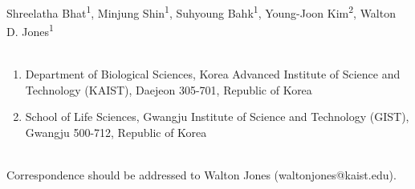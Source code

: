 Shreelatha Bhat\textsuperscript{1}, Minjung Shin\textsuperscript{1}, Suhyoung Bahk\textsuperscript{1}, Young-Joon Kim\textsuperscript{2}, Walton D. Jones\textsuperscript{1}
\\
\\
\begin{enumerate}
\item Department of Biological Sciences, Korea Advanced Institute of Science and Technology (KAIST), Daejeon 305-701, Republic of Korea
\item School of Life Sciences, Gwangju Institute of Science and Technology (GIST), Gwangju 500-712, Republic of Korea
\end{enumerate}
\\
Correspondence should be addressed to Walton Jones (waltonjones@kaist.edu).